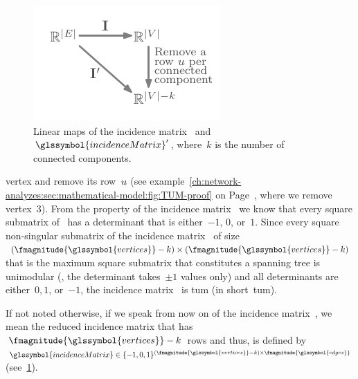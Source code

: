 % 
\begin{figure}%
    \includegraphics[scale=1,page=1]{networkAnalyzes/figures/NotesOnTheIncidenceProperty.pdf}
    \caption[Linear maps of the incidence matrix~.]{%
    Linear maps of the incidence matrix~
    and~$\glssymbol{incidenceMatrix}'$, where~$k$ is the number of connected
    components.
    }%
    \label{ch:network-analysis:fig:mapping-incidenceMatrix}%
\end{figure}%
%
\noindent vertex and remove its row~$u$ (see
example~\cref{ch:network-analyzes:sec:mathematical-model:fig:TUM-proof}
 on Page~\pageref{ch:network-analyzes:sec:mathematical-model:fig:TUM-proof},
where we remove vertex~$3$). From the property of the incidence
matrix~ we know that every square submatrix
of~ has a determinant that is either~$-1$, $0$,
or~$1$. Since every square non-singular submatrix of the incidence
matrix~ of
size~$(\fmagnitude{\glssymbol{vertices}}-k)\times(\fmagnitude{
\glssymbol{vertices}}-k)$ that is the maximum square submatrix that constitutes
a spanning tree is unimodular (\ie, the determinant takes~$\pm 1$ values only)
and all determinants are either~$0, 1$, or~$-1$, the incidence
matrix~ is \acrlong{tum} (in short~\gls{tum}).

\noindent If not noted otherwise, if we speak from now on of the incidence
matrix~, we mean the reduced incidence matrix that
has~$\fmagnitude{\glssymbol{vertices}}-k$ rows and thus, is defined by~$
    \glssymbol{incidenceMatrix}
    \in
    \{-1,0,1\}^{
        (
            \fmagnitude{\glssymbol{vertices}}-k
        )
        \times
        \fmagnitude{\glssymbol{edges}}
    }
$ (see~\cref{ch:network-analysis:fig:mapping-incidenceMatrix}).
% 
% 
